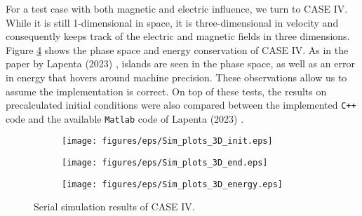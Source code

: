 For a test case with both magnetic and electric influence, we turn to CASE IV. While it is still 1-dimensional in space, it is three-dimensional in velocity and consequently keeps track of the electric and magnetic fields in three dimensions. Figure \ref{fig: 1D-3V-sim} shows the phase space and energy conservation of CASE IV. As in the paper by Lapenta (2023) \cite{lapenta_advances_2023}, islands are seen in the phase space, as well as an error in energy that hovers around machine precision. These observations allow us to assume the implementation is correct. On top of these tests, the results on precalculated initial conditions were also compared between the implemented \texttt{C++} code and the available \texttt{Matlab} code of Lapenta (2023) \cite{lapenta_advances_2023}.

\begin{figure}[h]
\centering
\begin{subfigure}{0.7\linewidth}
  \texttt{[image: figures/eps/Sim\_plots\_3D\_init.eps]}
  \label{fig: ecsim-sim-1d3v-init}  
\end{subfigure}
\vfill
\begin{subfigure}{0.7\linewidth}
  \texttt{[image: figures/eps/Sim\_plots\_3D\_end.eps]}
  \label{fig: ecsim-sim-1d3v-end}
\end{subfigure}
\vfill
\begin{subfigure}{0.7\linewidth}
  \texttt{[image: figures/eps/Sim\_plots\_3D\_energy.eps]}
  \label{fig: ecsim-sim-1d3v-energy}
\end{subfigure}
\caption{Serial simulation results of CASE IV.}
\label{fig: 1D-3V-sim}
\end{figure}


